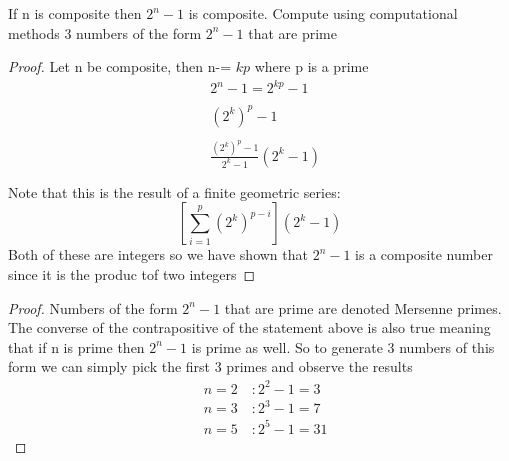 \documentclass[11pt]{article}
\theoremstyle{definition}  %
\newcommand{\block}[2]{\begin{tcolorbox}[title={#1}]{#2}\end{tcolorbox}}
\begin{document}
\block{Problem 5}{
If n is composite then $2^n-1$ is composite. Compute using computational methods 3 numbers of the form $2^n-1$ that are prime
}
\begin{proof}
  Let n be composite, then n-= $kp$ where p is a prime
  \begin{align*}
    &2^n-1=2^{kp}-1\\\\
    &(2^k)^p-1\\\\
    &\frac{(2^k)^p-1}{2^k-1}(2^k-1)\\\\
  \end{align*}
  Note that this is the result of a finite geometric series:
  \[
    \left[\sum_{i=1}^p(2^k)^{p-i}\right](2^k-1)
  \]
  Both of these are integers so we have shown that $2^n-1$ is a composite number since it is the produc tof two integers


\end{proof}
\begin{proof}
  Numbers of the form $2^n-1$ that are prime are denoted Mersenne primes. The converse of the  contrapositive of the statement above is also true meaning that if n is prime then $2^n-1$ is prime as well. So to generate 3 numbers of this form we can simply pick the first 3 primes and observe the results
  \begin{align*}
    &n=2\quad: 2^2-1=3\\
    &n=3\quad: 2^3-1=7\\
    &n=5\quad: 2^5-1=31
  \end{align*}
\end{proof}
\end{document}
